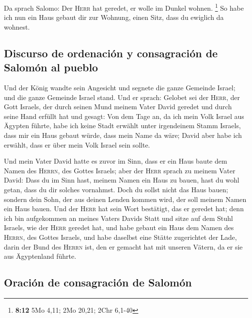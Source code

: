  Da sprach Salomo: Der \textsc{Herr} hat geredet, er
wolle im Dunkel wohnen. \footnote{\textbf{8:12} 5Mo 4,11; 2Mo 20,21;
  2Chr 6,1-40}  So habe ich nun ein Haus gebaut dir zur
Wohnung, einen Sitz, dass du ewiglich da wohnest.

\hypertarget{discurso-de-ordenaciuxf3n-y-consagraciuxf3n-de-salomuxf3n-al-pueblo}{%
\subsection{Discurso de ordenación y consagración de Salomón al
pueblo}\label{discurso-de-ordenaciuxf3n-y-consagraciuxf3n-de-salomuxf3n-al-pueblo}}

 Und der König wandte sein Angesicht und segnete die
ganze Gemeinde Israel; und die ganze Gemeinde Israel stand.
 Und er sprach: Gelobet sei der \textsc{Herr}, der Gott
Israels, der durch seinen Mund meinem Vater David geredet und durch
seine Hand erfüllt hat und gesagt:  Von dem Tage an, da
ich mein Volk Israel aus Ägypten führte, habe ich keine Stadt erwählt
unter irgendeinem Stamm Israels, dass mir ein Haus gebaut würde, dass
mein Name da wäre; David aber habe ich erwählt, dass er über mein Volk
Israel sein sollte.

 Und mein Vater David hatte es zuvor im Sinn, dass er ein
Haus baute dem Namen des \textsc{Herrn}, des Gottes Israels;
 aber der \textsc{Herr} sprach zu meinem Vater David:
Dass du im Sinn hast, meinem Namen ein Haus zu bauen, hast du wohl
getan, dass du dir solches vornahmst.  Doch du sollst
nicht das Haus bauen; sondern dein Sohn, der aus deinen Lenden kommen
wird, der soll meinem Namen ein Haus bauen.  Und der
\textsc{Herr} hat sein Wort bestätigt, das er geredet hat; denn ich bin
aufgekommen an meines Vaters Davids Statt und sitze auf dem Stuhl
Israels, wie der \textsc{Herr} geredet hat, und habe gebaut ein Haus dem
Namen des \textsc{Herrn}, des Gottes Israels,  und habe
daselbst eine Stätte zugerichtet der Lade, darin der Bund des
\textsc{Herrn} ist, den er gemacht hat mit unseren Vätern, da er sie aus
Ägyptenland führte.

\hypertarget{oraciuxf3n-de-consagraciuxf3n-de-salomuxf3n}{%
\subsection{Oración de consagración de
Salomón}\label{oraciuxf3n-de-consagraciuxf3n-de-salomuxf3n}}

